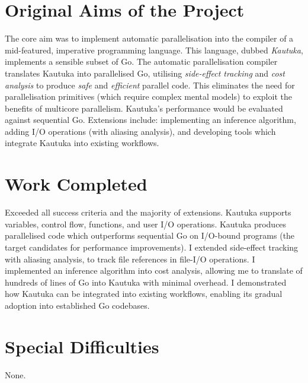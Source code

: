 \documentclass[12pt,a4paper,twoside,openright]{report}
\begin{document}
\section*{Original Aims of the Project}
The core aim was to implement automatic parallelisation into the compiler of a mid-featured, imperative programming language. This language, dubbed \textit{Kautuka}, implements a sensible subset of Go. The automatic parallelisation compiler translates Kautuka into parallelised Go, utilising \textit{side-effect tracking} and \textit{cost analysis} to produce \textit{safe} and \textit{efficient} parallel code. This eliminates the need for parallelisation primitives (which require complex mental models) to exploit the benefits of multicore parallelism. Kautuka's performance would be evaluated against sequential Go. Extensions include: implementing an inference algorithm, adding I/O operations (with aliasing analysis), and developing tools which integrate Kautuka into existing workflows.

\section*{Work Completed}

Exceeded all success criteria and the majority of extensions. Kautuka supports variables, control flow, functions, and user I/O operations. Kautuka produces parallelised code which outperforms sequential Go on I/O-bound programs (the target candidates for performance improvements). I extended side-effect tracking with aliasing analysis, to track file references in file-I/O operations. I implemented an inference algorithm into cost analysis, allowing me to translate of hundreds of lines of Go into Kautuka with minimal overhead. I demonstrated how Kautuka can be integrated into existing workflows, enabling its gradual adoption into established Go codebases.

\section*{Special Difficulties}

None.

\tableofcontents


\newpage
{}
\setcounter{page}{1}


\end{document}
